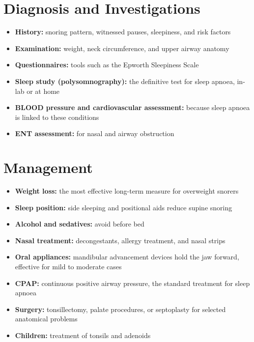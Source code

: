 \section*{Diagnosis and Investigations}
\begin{itemize}
    \item \textbf{History:} snoring pattern, witnessed pauses, sleepiness, and risk factors
    \item \textbf{Examination:} weight, neck circumference, and upper airway anatomy
    \item \textbf{Questionnaires:} tools such as the Epworth Sleepiness Scale
    \item \textbf{Sleep study (polysomnography):} the definitive test for sleep apnoea, in-lab or at home
    \item \textbf{BLOOD pressure and cardiovascular assessment:} because sleep apnoea is linked to these conditions
    \item \textbf{ENT assessment:} for nasal and airway obstruction
\end{itemize}

\section*{Management}
\begin{itemize}
    \item \textbf{Weight loss:} the most effective long-term measure for overweight snorers
    \item \textbf{Sleep position:} side sleeping and positional aids reduce supine snoring
    \item \textbf{Alcohol and sedatives:} avoid before bed
    \item \textbf{Nasal treatment:} decongestants, allergy treatment, and nasal strips
    \item \textbf{Oral appliances:} mandibular advancement devices hold the jaw forward, effective for mild to moderate cases
    \item \textbf{CPAP:} continuous positive airway pressure, the standard treatment for sleep apnoea
    \item \textbf{Surgery:} tonsillectomy, palate procedures, or septoplasty for selected anatomical problems
    \item \textbf{Children:} treatment of tonsils and adenoids
\end{itemize}

